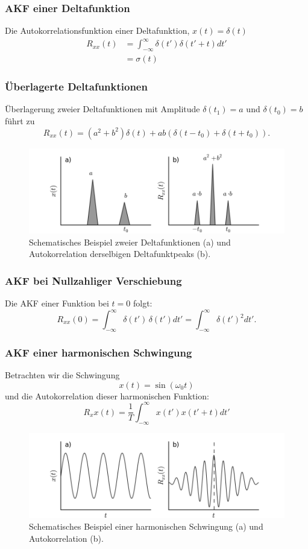 \subsubsection*{AKF einer Deltafunktion}
Die Autokorrelationsfunktion einer Deltafunktion, $x(t) = \delta(t)$
\begin{align*}
R_{xx}(t) & = \int_{-\infty}^\infty \delta(t') \delta(t'+t) dt'\\
& = \sigma(t)
\end{align*}

\subsubsection*{Überlagerte Deltafunktionen}
Überlagerung zweier Deltafunktionen mit Amplitude $\delta(t_1) = a$ und $\delta(t_0) = b$ führt zu
\[
R_{xx}(t) = (a^2 + b^2)\delta(t) + ab(\delta(t-t_0) + \delta(t+t_0)).
\]

\begin{figure}[h!]
\centering
\includegraphics[width=.9\tw]{fig/09-Korrelation/02-example_deltafct.png}
\caption{Schematisches Beispiel zweier Deltafunktionen (a) und Autokorrelation derselbigen Deltafunktpeaks (b).}
\end{figure}

\subsubsection*{AKF bei Nullzahliger Verschiebung}
Die AKF einer Funktion bei $t=0$ folgt:
\[
R_{xx}(0) = \int_{-\infty}^\infty \delta(t')\,\delta(t') dt' = \int_{-\infty}^\infty \delta(t')^2 dt'.
\]


\subsubsection*{AKF einer harmonischen Schwingung}
Betrachten wir die Schwingung
\[
x(t) = \sin(\omega_0 t)
\]
und die Autokorrelation dieser harmonischen Funktion:
\[
R_xx(t) = \frac{1}{T} \int_{-\infty}^\infty x(t') x(t'+t) dt'
\]
\begin{figure}[h!]
\centering
\includegraphics[width=.9\tw]{fig/09-Korrelation/03-example_harmonic.png}
\caption{Schematisches Beispiel einer harmonischen Schwingung (a) und Autokorrelation (b).}
\end{figure}

